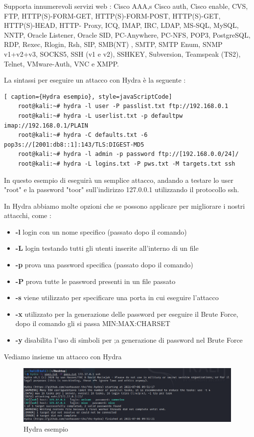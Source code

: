 Supporta innumerevoli servizi web : Cisco AAA,s Cisco auth, Cisco enable, CVS, FTP, HTTP(S)-FORM-GET, HTTP(S)-FORM-POST, HTTP(S)-GET, HTTP(S)-HEAD, HTTP- Proxy, ICQ, IMAP, IRC, LDAP, MS-SQL, MySQL, NNTP, Oracle Listener, Oracle SID, PC-Anywhere, PC-NFS, POP3, PostgreSQL, RDP, Rexec, Rlogin, Rsh, SIP, SMB(NT) , SMTP, SMTP Enum, SNMP v1+v2+v3, SOCKS5, SSH (v1 e v2), SSHKEY, Subversion, Teamspeak (TS2), Telnet, VMware-Auth, VNC e XMPP.

La sintassi per eseguire un attacco con Hydra è la seguente :

\begin{lstlisting}[ caption={Hydra esempio}, style=javaScriptCode]
    root@kali:~# hydra -l user -P passlist.txt ftp://192.168.0.1
    root@kali:~# hydra -L userlist.txt -p defaultpw imap://192.168.0.1/PLAIN
    root@kali:~# hydra -C defaults.txt -6 pop3s://[2001:db8::1]:143/TLS:DIGEST-MD5
    root@kali:~# hydra -l admin -p password ftp://[192.168.0.0/24]/
    root@kali:~# hydra -L logins.txt -P pws.txt -M targets.txt ssh
\end{lstlisting}

In questo esempio di eseguirà un semplice attacco, andando a testare lo user "root" e la password "toor" sull'indirizzo 127.0.0.1 utilizzando il protocollo ssh.

In Hydra abbiamo molte opzioni che se possono applicare per migliorare i nostri attacchi, come :
\begin{itemize}
    \item \textbf{-l} login con un nome specifico (passato dopo il comando)
    \item \textbf{-L} login testando tutti gli utenti inserite all'interno di un file 
    \item \textbf{-p} prova una password specifica (passato dopo il comando)
    \item \textbf{-P} prova tutte le password presenti in un file passato
    \item \textbf{-s} viene utilizzato per specificare una porta in cui eseguire l'attacco 
    \item \textbf{-x} utilizzato per la generazione delle password per eseguire il Brute Force, dopo il comando gli si passa MIN:MAX:CHARSET
    \item \textbf{-y} disabilita l'uso di simboli per ;a generazione di password nel Brute Force
\end{itemize}

Vediamo insieme un attacco con Hydra 

\begin{figure}[htpb!]
    \centering
    \includegraphics[width=\linewidth]{Immagini/5/hydra.png}
    \caption{Hydra esempio}
    \label{fig:Hydra example}
\end{figure}

